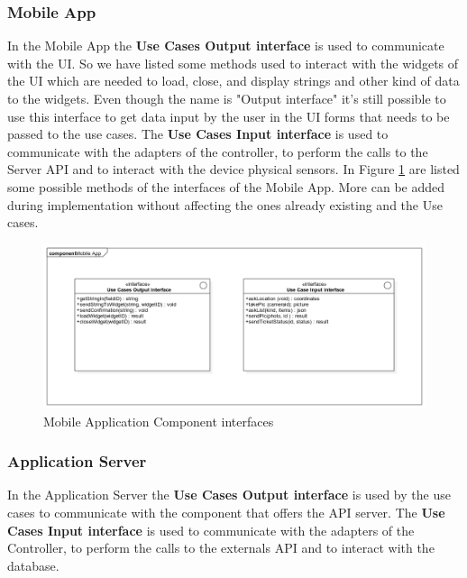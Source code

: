 \subsubsection{Mobile App}
In the Mobile App the \textbf{Use Cases Output interface} is used to communicate with the UI.
So we have listed some methods used to interact with the widgets of the UI which are needed to load, close, and display strings and other kind of data to the widgets. Even though the name is "Output interface" it's still possible to use this interface to get data input by the user in the UI forms that needs to be passed to the use cases.
The \textbf{Use Cases Input interface} is used to communicate with the adapters of the controller, to perform the calls to the Server API and to interact with the device physical sensors.
In Figure \ref{fig:AppInterfaces} are listed some possible methods of the interfaces of the Mobile App. More can be added during implementation without affecting the ones already existing and the Use cases.

\begin{figure}[H]
\centering
\includegraphics[width=\textwidth]{Images/AppInterfaces.png}
\caption{\label{fig:AppInterfaces} Mobile Application Component interfaces}
\end{figure}

\subsubsection{Application Server}
In the Application Server the \textbf{Use Cases Output interface} is used by the use cases to communicate with the component that offers the API server.
The \textbf{Use Cases Input interface} is used to communicate with the adapters of the Controller, to perform the calls to the externals API and to interact with the database.

